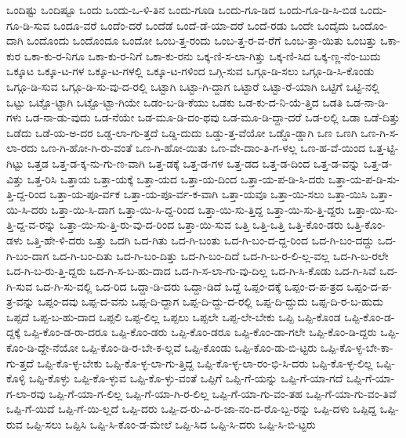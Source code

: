 {ಒಂದಿಷ್ಟು
ಒಂದಿಷ್ಟೂ
ಒಂದು
ಒಂದು-ಒ-ಳಿ-ತಿನ
ಒಂದು-ಗೂಡಿ
ಒಂದು-ಗೂ-ಡಿದ
ಒಂದು-ಗೂ-ಡಿ-ಸಿ-ಬಿಡ
ಒಂದು-ಗೂ-ಡಿ-ಸುವ
ಒಂದೂ-ವರೆ
ಒಂದೆಂ-ದರೆ
ಒಂದೆಡೆ
ಒಂದೆ-ಡೆ-ಯಾ-ದರೆ
ಒಂದೆ-ರಡು
ಒಂದೇ
ಒಂದೈದು
ಒಂದೊಂ-ದಾಗಿ
ಒಂದೊಂದು
ಒಂದೊಂದೂ
ಒಂದೋ
ಒಂಬ-ತ್ತ-ರಂದು
ಒಂಬ-ತ್ತ-ರ-ವ-ರೆಗೆ
ಒಂಬ-ತ್ತಾ-ಯಿತು
ಒಂಬತ್ತು
ಒಕಾ-ಕುರ
ಒಕಾ-ಕು-ರ-ನಿಗೂ
ಒಕಾ-ಕು-ರ-ನಿಗೆ
ಒಕಾ-ಕು-ರನು
ಒಕ್ಕ-ಣಿ-ಸ-ಲಾ-ಗಿತ್ತು
ಒಕ್ಕ-ಣಿ-ಸಿದ
ಒಕ್ಕ-ಣ್ಣ-ನೆಂ-ಬುದು
ಒಕ್ಕೂಟ
ಒಕ್ಕೂ-ಟ-ಗಳ
ಒಕ್ಕೂ-ಟ-ಗಳಲ್ಲಿ
ಒಕ್ಕೂ-ಟ-ಗಳಿಂದ
ಒಗ್ಗಿ-ಸುವ
ಒಗ್ಗೂ-ಡಿ-ಸಲು
ಒಗ್ಗೂ-ಡಿ-ಸಿ-ಕೊಂಡು
ಒಗ್ಗೂ-ಡಿ-ಸುವ
ಒಗ್ಗೂ-ಡಿ-ಸು-ವು-ದ-ರಲ್ಲಿ
ಒಟ್ಟಾಗಿ
ಒಟ್ಟಾ-ಗಿ-ದ್ದಾಗ
ಒಟ್ಟಾರೆ
ಒಟ್ಟಾ-ರೆ-ಯಾಗಿ
ಒಟ್ಟಿಗೆ
ಒಟ್ಟಿ-ನಲ್ಲಿ
ಒಟ್ಟು
ಒಟ್ಟೊ-ಟ್ಟಾಗಿ
ಒಟ್ಟೊ-ಟ್ಟಾ-ಗಿಯೇ
ಒಡಂ-ಬ-ಡಿ-ಕೆಯು
ಒಡಕು
ಒಡ-ಕು-ದ-ನಿ-ಯೆ-ತ್ತಿದ
ಒಡತಿ
ಒಡ-ನಾ-ಡಿ-ಗಳು
ಒಡ-ನಾ-ಡು-ವುದು
ಒಡ-ನೆಯೇ
ಒಡ-ಮೂ-ಡಿ-ದಂ-ಥವು
ಒಡ-ಮೂ-ಡಿ-ದ್ದಾ-ದರೆ
ಒಡ-ಲಲ್ಲಿ
ಒಡಾ
ಒಡೆ-ದಿತ್ತು
ಒಡೆದು
ಒಡೆ-ಯ-ಅ-ದರ
ಒಡ್ಡ-ಲಾ-ಗು-ತ್ತದೆ
ಒಡ್ಡಿ-ದುದು
ಒಡ್ಡು-ತ್ತ-ವೆಯೋ
ಒಡ್ಡೊ-ಡ್ಡಾಗಿ
ಒಣ
ಒಣಗಿ
ಒಣ-ಗಿ-ಸ-ಲಾ-ರದು
ಒಣ-ಗಿ-ಹೋ-ಗಿ-ರು-ವಂತೆ
ಒಣ-ಗಿ-ಹೋ-ಯಿತು
ಒಣ-ವೇ-ದಾಂ-ತಿ-ಗ-ಳಲ್ಲ
ಒಣ-ಹ-ವೆ-ಯಿಂದ
ಒತ್ತ-ಟ್ಟಿ-ಗಿಟ್ಟು
ಒತ್ತಡ
ಒತ್ತ-ಡ-ಕ್ಕ-ನು-ಗು-ಣ-ವಾಗಿ
ಒತ್ತ-ಡಕ್ಕೆ
ಒತ್ತ-ಡ-ಗಳ
ಒತ್ತ-ಡದ
ಒತ್ತ-ಡ-ದಿಂದ
ಒತ್ತ-ಡ-ವನ್ನು
ಒತ್ತ-ಡ-ವಿತ್ತು
ಒತ್ತ-ರಿಸಿ
ಒತ್ತಾಯ
ಒತ್ತಾ-ಯಕ್ಕೆ
ಒತ್ತಾ-ಯದ
ಒತ್ತಾ-ಯ-ದಿಂದ
ಒತ್ತಾ-ಯ-ಪ-ಡಿ-ಸಿ-ದರು
ಒತ್ತಾ-ಯ-ಪ-ಡಿ-ಸು-ತ್ತಿ-ದ್ದ-ರಿಂದ
ಒತ್ತಾ-ಯ-ಪೂ-ರ್ವಕ
ಒತ್ತಾ-ಯ-ಪೂ-ರ್ವ-ಕ-ವಾಗಿ
ಒತ್ತಾ-ಯವೂ
ಒತ್ತಾ-ಯಿ-ಸಲು
ಒತ್ತಾ-ಯಿಸಿ
ಒತ್ತಾ-ಯಿ-ಸಿ-ದರು
ಒತ್ತಾ-ಯಿ-ಸಿ-ದಾಗ
ಒತ್ತಾ-ಯಿ-ಸಿ-ದ್ದ-ರಿಂದ
ಒತ್ತಾ-ಯಿ-ಸು-ತ್ತಿದ್ದ
ಒತ್ತಾ-ಯಿ-ಸು-ತ್ತಿ-ದ್ದರು
ಒತ್ತಾ-ಯಿ-ಸು-ತ್ತಿ-ದ್ದ-ವ-ರನ್ನು
ಒತ್ತಾ-ಯಿ-ಸು-ತ್ತಿ-ರು-ವು-ದ-ರಿಂದ
ಒತ್ತಾ-ಯಿ-ಸುವ
ಒತ್ತಿ
ಒತ್ತಿ-ಒತ್ತಿ
ಒತ್ತಿ-ಕೊಂ-ಡರು
ಒತ್ತಿ-ಕೊಂ-ಡಳು
ಒತ್ತಿ-ಹೇ-ಳಿ-ದರು
ಒತ್ತು
ಒದಗಿ
ಒದ-ಗಿತು
ಒದ-ಗಿ-ಬಂತು
ಒದ-ಗಿ-ಬಂ-ದ-ದ್ದ-ರಿಂದ
ಒದ-ಗಿ-ಬಂ-ದದ್ದು
ಒದ-ಗಿ-ಬಂ-ದಾಗ
ಒದ-ಗಿ-ಬಂ-ದಿತು
ಒದ-ಗಿ-ಬಂ-ದಿತ್ತು
ಒದ-ಗಿ-ಬಂ-ದಿದೆ
ಒದ-ಗಿ-ಬ-ರ-ಲಿ-ಲ್ಲ-ವಲ್ಲ
ಒದ-ಗಿ-ಬ-ರಲೇ
ಒದ-ಗಿ-ಬ-ರು-ತ್ತಿ-ದ್ದರು
ಒದ-ಗಿ-ಸ-ಬ-ಹು-ದಾದ
ಒದ-ಗಿ-ಸ-ಲಾ-ಗು-ವು-ದಿಲ್ಲ
ಒದ-ಗಿ-ಸಿ-ಕೊಡು
ಒದ-ಗಿ-ಸಿವೆ
ಒದ-ಗಿ-ಸುವ
ಒದ-ಗಿ-ಸು-ವಲ್ಲಿ
ಒದ-ರಿದ
ಒದ್ದಾ-ಡಿ-ದರು
ಒದ್ದಾ-ಡಿದೆ
ಒದ್ದೆ
ಒಪ್ಪಂ-ದಕ್ಕೆ
ಒಪ್ಪಂ-ದ-ಪ-ತ್ರದ
ಒಪ್ಪಂ-ದ-ಪ-ತ್ರ-ವನ್ನು
ಒಪ್ಪಂ-ದವು
ಒಪ್ಪ-ದ-ವನು
ಒಪ್ಪ-ದಿ-ದ್ದಾಗ
ಒಪ್ಪ-ದಿ-ದ್ದು-ದ-ರಲ್ಲಿ
ಒಪ್ಪ-ದಿ-ದ್ದುದು
ಒಪ್ಪ-ದಿ-ರ-ಬ-ಹುದು
ಒಪ್ಪದೆ
ಒಪ್ಪ-ಬ-ಹು-ದಾದ
ಒಪ್ಪಲಿ
ಒಪ್ಪ-ಲಿಲ್ಲ
ಒಪ್ಪಲು
ಒಪ್ಪಲೇ
ಒಪ್ಪ-ಲೇ-ಬೇಕು
ಒಪ್ಪಿ
ಒಪ್ಪಿ-ಕೊಂಡ
ಒಪ್ಪಿ-ಕೊಂ-ಡ-ದ್ದಕ್ಕೆ
ಒಪ್ಪಿ-ಕೊಂ-ಡ-ರಾ-ದರೂ
ಒಪ್ಪಿ-ಕೊಂ-ಡರು
ಒಪ್ಪಿ-ಕೊಂ-ಡರೂ
ಒಪ್ಪಿ-ಕೊಂ-ಡಾ-ಗಲೇ
ಒಪ್ಪಿ-ಕೊಂ-ಡಿ-ದ್ದರು
ಒಪ್ಪಿ-ಕೊಂ-ಡಿ-ದ್ದೇ-ನೆಯೋ
ಒಪ್ಪಿ-ಕೊಂ-ಡಿ-ರ-ಬೇ-ಕ-ಲ್ಲವೆ
ಒಪ್ಪಿ-ಕೊಂಡು
ಒಪ್ಪಿ-ಕೊಂ-ಡು-ಬಿ-ಟ್ಟರು
ಒಪ್ಪಿ-ಕೊ-ಳ್ಳ-ಬೇ-ಕಾ-ಗು-ತ್ತದೆ
ಒಪ್ಪಿ-ಕೊ-ಳ್ಳ-ಬೇಕು
ಒಪ್ಪಿ-ಕೊ-ಳ್ಳ-ಲಾ-ಗು-ತ್ತಿದ್ದ
ಒಪ್ಪಿ-ಕೊ-ಳ್ಳ-ಲಾ-ರಂ-ಭಿ-ಸಿ-ದರು
ಒಪ್ಪಿ-ಕೊ-ಳ್ಳ-ಲಿಲ್ಲ
ಒಪ್ಪಿ-ಕೊಳ್ಳಿ
ಒಪ್ಪಿ-ಕೊಳ್ಳು
ಒಪ್ಪಿ-ಕೊ-ಳ್ಳುವ
ಒಪ್ಪಿ-ಕೊ-ಳ್ಳು-ವಂತೆ
ಒಪ್ಪಿಗೆ
ಒಪ್ಪಿ-ಗೆ-ಯನ್ನು
ಒಪ್ಪಿ-ಗೆ-ಯಾ-ಗದೆ
ಒಪ್ಪಿ-ಗೆ-ಯಾ-ಗ-ಲಾ-ರವು
ಒಪ್ಪಿ-ಗೆ-ಯಾ-ಗ-ಲಿಲ್ಲ
ಒಪ್ಪಿ-ಗೆ-ಯಾ-ಗಿ-ರ-ಲಿಲ್ಲ
ಒಪ್ಪಿ-ಗೆ-ಯಾ-ಗು-ವಂ-ತಹ
ಒಪ್ಪಿ-ಗೆ-ಯಾ-ಗು-ವಂ-ತಿವೆ
ಒಪ್ಪಿ-ಗೆ-ಯಿದೆ
ಒಪ್ಪಿ-ಗೆ-ಯಿ-ಲ್ಲದೆ
ಒಪ್ಪಿ-ದರು
ಒಪ್ಪಿ-ದ-ರು-ವಿ-ರ-ಜಾ-ನಂ-ದ-ರೊ-ಬ್ಬ-ರನ್ನು
ಒಪ್ಪಿ-ದಳು
ಒಪ್ಪಿದ್ದ
ಒಪ್ಪಿ-ರುವ
ಒಪ್ಪಿ-ಸಲು
ಒಪ್ಪಿಸಿ
ಒಪ್ಪಿ-ಸಿ-ಕೊಂ-ಡ-ಮೇಲೆ
ಒಪ್ಪಿ-ಸಿದ
ಒಪ್ಪಿ-ಸಿ-ದರು
ಒಪ್ಪಿ-ಸಿ-ಬಿ-ಟ್ಟರು
}

